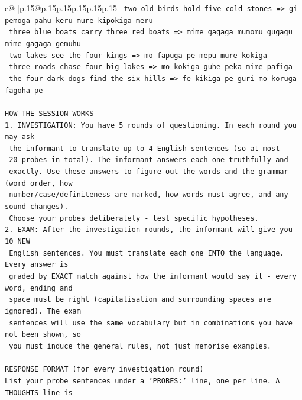 \documentclass{article}
\begin{document}
{\begin{supertabular}{c@{$\;$}|p{.15\linewidth}@{}p{.15\linewidth}p{.15\linewidth}p{.15\linewidth}p{.15\linewidth}p{.15\linewidth}}
{{{\texttt{    two old birds hold five cold stones  =>  gi pemoga pahu keru mure kipokiga meru} \\
\texttt{    three blue boats carry three red boats  =>  mime gagaga mumomu gugagu mime gagaga gemuhu} \\
\texttt{    two lakes see the four kings  =>  mo fapuga pe mepu mure kokiga} \\
\texttt{    three roads chase four big lakes  =>  mo kokiga guhe peka mime pafiga} \\
\texttt{    the four dark dogs find the six hills  =>  fe kikiga pe guri mo koruga fagoha pe} \\
\\ 
\texttt{HOW THE SESSION WORKS} \\
\texttt{1. INVESTIGATION: You have 5 rounds of questioning. In each round you may ask} \\
\texttt{   the informant to translate up to 4 English sentences (so at most} \\
\texttt{   20 probes in total). The informant answers each one truthfully and} \\
\texttt{   exactly. Use these answers to figure out the words and the grammar (word order, how} \\
\texttt{   number/case/definiteness are marked, how words must agree, and any sound changes).} \\
\texttt{   Choose your probes deliberately {-} test specific hypotheses.} \\
\texttt{2. EXAM: After the investigation rounds, the informant will give you 10 NEW} \\
\texttt{   English sentences. You must translate each one INTO the language. Every answer is} \\
\texttt{   graded by EXACT match against how the informant would say it {-} every word, ending and} \\
\texttt{   space must be right (capitalisation and surrounding spaces are ignored). The exam} \\
\texttt{   sentences will use the same vocabulary but in combinations you have not been shown, so} \\
\texttt{   you must induce the general rules, not just memorise examples.} \\
\\ 
\texttt{RESPONSE FORMAT (for every investigation round)} \\
\texttt{List your probe sentences under a 'PROBES:' line, one per line. A THOUGHTS line is} \\
}}}
\end{supertabular}}
\end{document}
